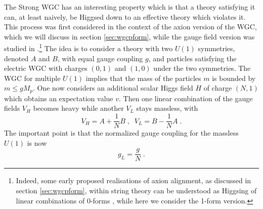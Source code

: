\documentclass[11pt,a4paper]{article}
\numberwithin{equation}{section}
\numberwithin{table}{section}\setlength{\multlinegap}{25pt}
\newcommand{\be}{\begin{equation}}
\newcommand{\ee}{\end{equation}}
\begin{document}
The Strong WGC has an interesting property which is that a theory satisfying it can, at least naively, be Higgsed down to an effective theory which violates it. This process was first considered in the context of the axion version of the WGC, which we will discuss in section \ref{sec:wgcpform}, while the gauge field version was studied in \cite{Saraswat:2016eaz}.\footnote{Indeed, some early proposed realisations of axion alignment, as discussed in section \ref{sec:wgcpform}, within string theory can be understood as Higgsing of linear combinations of 0-forms \cite{Hebecker:2015rya,Hebecker:2018fln}, while here we consider the 1-form version.} The idea is to consider a theory with two $U(1)$ symmetries, denoted $A$ and $B$, with equal gauge coupling $g$, and particles satisfying the electric WGC with charges $\left(0,1\right)$ and $\left(1,0\right)$ under the two symmetries. The WGC for multiple $U(1)$ implies that the mass of the particles $m$ is bounded by $m \leq g M_p$. One now considers an additional scalar Higgs field $H$ of charge $\left(N,1\right)$ which obtains an expectation value $v$. Then one linear combination of the gauge fields $V_H$ becomes heavy while another $V_L$ stays massless, with
\be
V_H = A + \frac{1}{N} B \;,\;\; V_L = B - \frac{1}{N} A\;.
\ee
The important point is that the normalized gauge coupling for the massless $U(1)$ is now 
\be
g_L = \frac{g}{N} \;.
\ee
\end{document}

